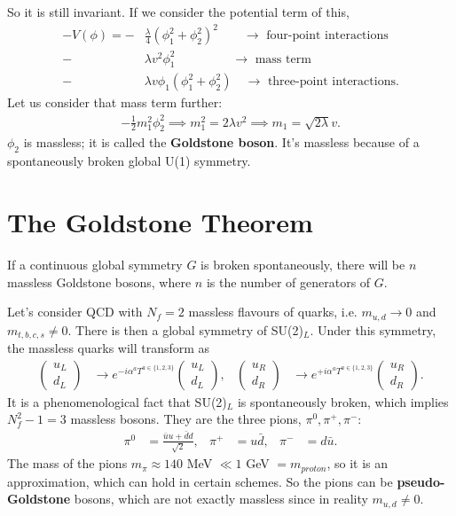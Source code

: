\documentclass[relqm.tex]{subfiles}
\begin{document}
So it is still invariant.
If we consider the potential term of this, 
\begin{equation}
    \begin{split}
        -V(\phi) = -&\frac{\lambda}{4}(\phi_1^2+\phi_2^2)^2 \quad\quad\to\text{ four-point interactions} \\
                   -& \lambda v^2\phi_1^2 \;\;\quad\quad\quad\quad\to\text{ mass term} \\
                   -& \lambda v\phi_1(\phi_1^2+\phi_2^2) \quad\to\text{ three-point interactions}.
    \end{split}
\end{equation}
Let us consider that mass term further:
\begin{align}
    -\frac12 m_1^2\phi_2^2 \implies m_1^2 = 2\lambda v^2 \implies m_1 = \sqrt{2\lambda}v.
\end{align}
$\phi_2$ is massless; it is called the \textbf{Goldstone boson}.
It's massless because of a spontaneously broken global U(1) symmetry.

\section{The Goldstone Theorem}
If a continuous global symmetry $G$ is broken spontaneously, there will be $n$ massless Goldstone bosons, where $n$ is the number of generators of $G$.

Let's consider QCD with $N_f=2$ massless flavours of quarks, i.e. $m_{u,d}\to0$ and $m_{t,b,c,s}\neq0$.
There is then a global symmetry of SU(2)$_L$.
Under this symmetry, the massless quarks will transform as
\begin{align}
    \begin{pmatrix} u_L \\ d_L\end{pmatrix} &\to e^{-i\alpha^aT^{a\in\{1,2,3\}}}\begin{pmatrix}u_L\\ d_L\end{pmatrix}, & \begin{pmatrix} u_R \\ d_R\end{pmatrix} &\to e^{+i\alpha^aT^{a\in\{1,2,3\}}}\begin{pmatrix}u_R\\ d_R\end{pmatrix}. 
\end{align}
It is a phenomenological fact that SU(2)$_L$ is spontaneously broken, which implies $N_f^2-1=3$ massless bosons. 
They are the three pions, $\pi^0,\pi^+,\pi^-$:
\begin{align}
    \pi^0 &= \frac{\bar{u}u + \bar{d}d}{\sqrt{2}}, & \pi^+ &= u\bar{d}, & \pi^- &= d\bar{u}.
\end{align}
The mass of the pions $m_\pi \approx 140$ MeV $\ll 1$ GeV $= m_{proton}$, so it is an approximation, which can hold in certain schemes.
So the pions can be \textbf{pseudo-Goldstone} bosons, which are not exactly massless since in reality $m_{u,d}\neq0$.
\end{document}
